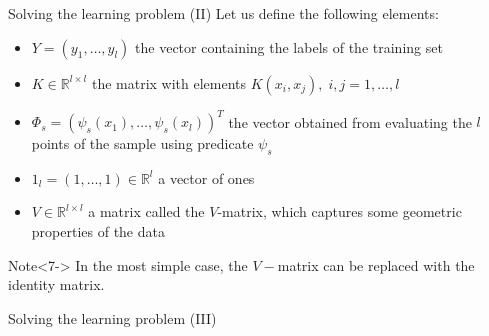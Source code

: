 \documentclass[10pt, dvipsnames]{beamer}
\begin{document}
\begin{frame}{Solving the learning problem (II)}
    Let us define the following elements:
    
    \begin{itemize}
        \item<2->  $Y = (y_1, \dots, y_l)$ the vector containing the labels of the training set
        \item<3-> $K \in \mathbb{R}^{l \times l}$ the matrix with elements $K(x_i, x_j),\; i, j = 1, \dots, l$
        \item<4-> $\Phi_s = (\psi_s(x_1), \dots, \psi_s(x_l))^T$ the vector obtained from evaluating the $l$ points
        of the sample using predicate $\psi_s$
        \item<5-> $1_l = (1, \dots, 1) \in \mathbb{R}^l$ a vector of ones
        \item<6-> $V \in \mathbb{R}^{l \times l}$ a matrix called
the $V$-matrix, which captures some geometric properties of the data
    \end{itemize}
    
    \begin{alertblock}{Note}<7->
        In the most simple case, the $V-$matrix can be replaced with the identity matrix.
    \end{alertblock}
\end{frame}

\begin{frame}{Solving the learning problem (III)}

    
\end{frame}
\end{document}
